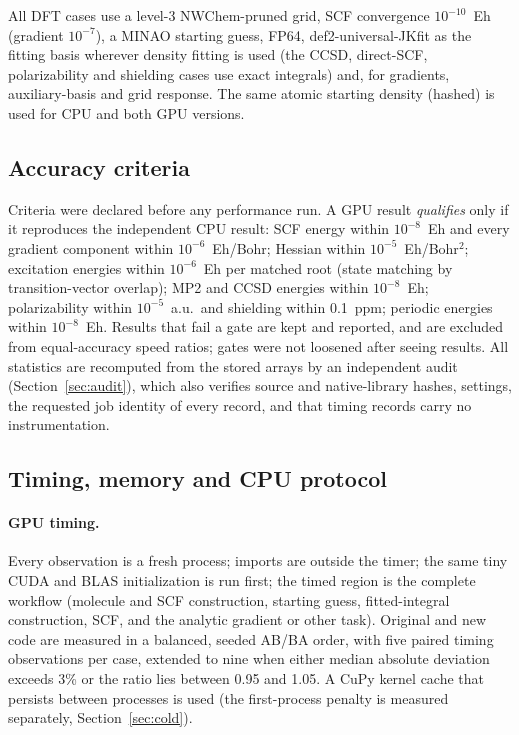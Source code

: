 All DFT cases use a level-3 NWChem-pruned grid, SCF convergence $10^{-10}$~Eh (gradient $10^{-7}$), a MINAO starting guess, FP64, def2-universal-JKfit as the fitting basis wherever density fitting is used (the CCSD, direct-SCF, polarizability and shielding cases use exact integrals) and, for gradients, auxiliary-basis and grid response. The same atomic starting density (hashed) is used for CPU and both GPU versions.

\subsection{Accuracy criteria}

Criteria were declared before any performance run. A GPU result \emph{qualifies} only if it reproduces the independent CPU result: SCF energy within $10^{-8}$~Eh and every gradient component within $10^{-6}$~Eh/Bohr; Hessian within $10^{-5}$~Eh/Bohr$^2$; excitation energies within $10^{-6}$~Eh per matched root (state matching by transition-vector overlap); MP2 and CCSD energies within $10^{-8}$~Eh; polarizability within $10^{-5}$~a.u.\ and shielding within 0.1~ppm; periodic energies within $10^{-8}$~Eh. Results that fail a gate are kept and reported, and are excluded from equal-accuracy speed ratios; gates were not loosened after seeing results. All statistics are recomputed from the stored arrays by an independent audit (Section~\ref{sec:audit}), which also verifies source and native-library hashes, settings, the requested job identity of every record, and that timing records carry no instrumentation.

\subsection{Timing, memory and CPU protocol}

\paragraph{GPU timing.} Every observation is a fresh process; imports are outside the timer; the same tiny CUDA and BLAS initialization is run first; the timed region is the complete workflow (molecule and SCF construction, starting guess, fitted-integral construction, SCF, and the analytic gradient or other task). Original and new code are measured in a balanced, seeded AB/BA order, with five paired timing observations per case, extended to nine when either median absolute deviation exceeds 3\% or the ratio lies between 0.95 and 1.05. A CuPy kernel cache that persists between processes is used (the first-process penalty is measured separately, Section~\ref{sec:cold}).

